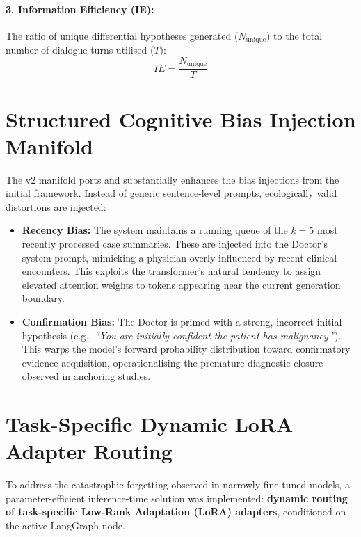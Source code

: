 \paragraph{3. Information Efficiency (IE):} The ratio of unique differential hypotheses generated ($N_{\text{unique}}$) to the total number of dialogue turns utilised ($T$):
\begin{equation}
IE = \frac{N_{\text{unique}}}{T}
\end{equation}

\section{Structured Cognitive Bias Injection Manifold}

The v2 manifold ports and substantially enhances the bias injections from the initial framework. Instead of generic sentence-level prompts, ecologically valid distortions are injected:

\begin{itemize}
    \item \textbf{Recency Bias:} The system maintains a running queue of the $k=5$ most recently processed case summaries. These are injected into the Doctor's system prompt, mimicking a physician overly influenced by recent clinical encounters. This exploits the transformer's natural tendency to assign elevated attention weights to tokens appearing near the current generation boundary.
    \item \textbf{Confirmation Bias:} The Doctor is primed with a strong, incorrect initial hypothesis (e.g., \textit{``You are initially confident the patient has malignancy.''}). This warps the model's forward probability distribution toward confirmatory evidence acquisition, operationalising the premature diagnostic closure observed in anchoring studies.
\end{itemize}

\section{Task-Specific Dynamic LoRA Adapter Routing}

To address the catastrophic forgetting observed in narrowly fine-tuned models, a parameter-efficient inference-time solution was implemented: \textbf{dynamic routing of task-specific Low-Rank Adaptation (LoRA) adapters}, conditioned on the active LangGraph node.

